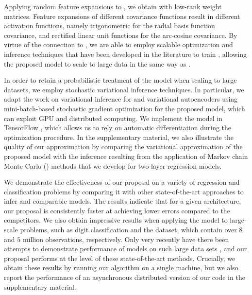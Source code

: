
Applying random feature expansions to , we obtain  with low-rank weight matrices.
Feature expansions of different covariance functions result in different \dnn activation functions, namely trigonometric for the radial basis function covariance, and rectified linear unit functions for the arc-cosine covariance.
By virtue of the connection to , we are able to employ scalable optimization and inference techniques that have been developed in the literature to train , allowing the proposed \dgp model to scale to large data in the same way as .

In order to retain a probabilistic treatment of the model when scaling to large datasets, we employ stochastic variational inference techniques.
In particular, we adapt the work on variational inference for  and variational autoencoders \citep{Graves11,Kingma14,Rezende14} using mini-batch-based stochastic gradient optimization for the proposed \dgp model, which can exploit GPU and distributed computing.
We implement the model in TensorFlow \citep{MartinAbadi15}, which allows us to rely on automatic differentiation during the optimization procedure.
In the supplementary material, we also illustrate the quality of our approximation by comparing the variational approximation of the proposed model with %
the inference resulting from the application of Markov chain Monte Carlo (\mcmc) methods that we develop for two-layer \dgp regression models.

We demonstrate the effectiveness of our proposal on a variety of regression and classification problems by comparing it with other state-of-the-art approaches to infer  and comparable models.
The results indicate that for a given \dgp architecture, our proposal is consistently faster at achieving lower errors  compared to the competitors.
We also obtain impressive results when applying the model to large-scale problems, such as \mnisteight digit classification and the \airline dataset, which contain over $8$ and $5$ million observations, respectively.
Only very recently have there been attempts to demonstrate performance of \gp models on such large data sets \citep{Wilson16,Krauth17}, and our proposal performs at the level of these state-of-the-art \gp methods.
Crucially, we obtain these results by running our algorithm on a single machine, but we also report the performance of an asynchronous distributed version of our code in the supplementary material.

